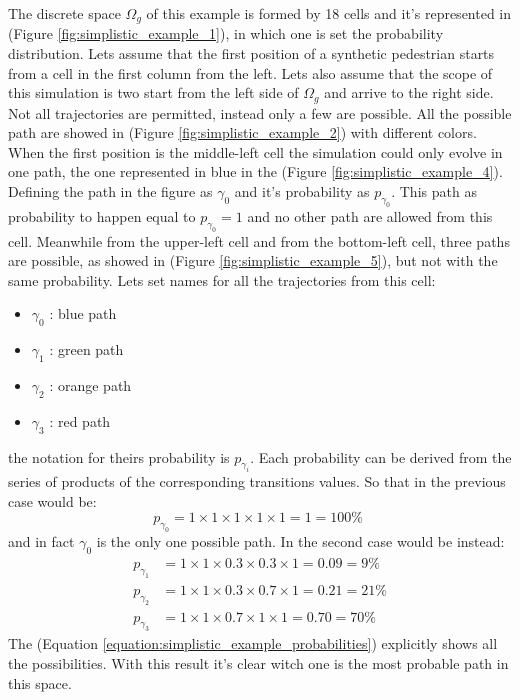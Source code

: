 \documentclass[class=article, crop=false]{standalone}
\begin{document}
The discrete space $\Omega_g$ of this example is formed by 18 cells and it's represented in (Figure \ref{fig:simplistic_example_1}), in which one is set the probability distribution.
Lets assume that the first position of a synthetic pedestrian starts from a cell in the first column from the left.
Lets also assume that the scope of this simulation is two start from the left side of $\Omega_g$ and arrive to the right side.
Not all trajectories are permitted, instead only a few are possible.
All the possible path are showed in (Figure \ref{fig:simplistic_example_2}) with different colors.
When the first position is the middle-left cell the simulation could only evolve in one path, the one represented in blue in the (Figure \ref{fig:simplistic_example_4}).
Defining the path in the figure as $\gamma_0$ and it's probability as $p_{\gamma_0}$.
This path as probability to happen equal to $p_{\gamma_0} = 1$ and no other path are allowed from this cell.
Meanwhile from the upper-left cell and from the bottom-left cell, three paths are possible, as showed in (Figure \ref{fig:simplistic_example_5}), but not with the same probability.
Lets set names for all the trajectories from this cell:
\begin{itemize}
\item $\gamma_0$ : blue path
\item $\gamma_1$ : green path
\item $\gamma_2$ : orange path
\item $\gamma_3$ : red path
\end{itemize}
the notation for theirs probability is $p_{\gamma_i}$.
Each probability can be derived from the series of products of the corresponding transitions values.
So that in the previous case would be:
\begin{equation*}
p_{\gamma_0} = 1 \times 1 \times 1 \times 1 \times 1 = 1 = 100 \% \;
\end{equation*}
and in fact $\gamma_0$ is the only one possible path.
In the second case would be instead:
\begin{equation}
\begin{split}
p_{\gamma_1} & = 1 \times 1 \times 0.3 \times 0.3 \times 1 = 0.09 = 9 \% \\
p_{\gamma_2} & = 1 \times 1 \times 0.3 \times 0.7 \times 1 = 0.21 = 21 \% \\
p_{\gamma_3} & = 1 \times 1 \times 0.7 \times 1 \times 1    = 0.70 = 70 \%
\end{split}
\label{equation:simplistic_example_probabilities}
\end{equation}
The (Equation \ref{equation:simplistic_example_probabilities}) explicitly shows all the possibilities.
With this result it's clear witch one is the most probable path in this space.
\end{document}
